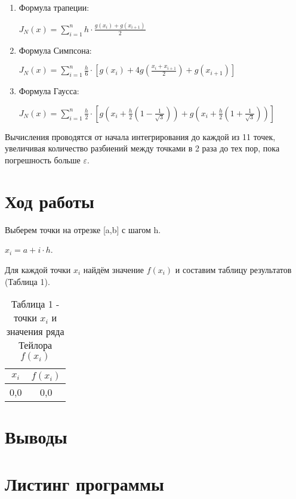 \documentclass[14pt]{article}
\begin{document}
\begin{enumerate}
{\begin{enumerate}
{                }
            \item {
                Формула трапеции:
                \begin{center}
                    $J_N(x) = \displaystyle\sum_{i=1}^{n}h \cdot \displaystyle\frac{g(x_i)+g(x_{i+1})}{2}$
                \end{center}
                }
            \item {
                Формула Симпсона:
                \begin{center}
                    $J_N(x) = \displaystyle\sum_{i=1}^{n}\displaystyle\frac{h}{6} \cdot \left[g(x_i)+4g\left(
                        \displaystyle\frac{x_i + x_{i+1}}{2}
                    \right) + g(x_{i+1}) \right]$
                \end{center}
                }
            \item {
                Формула Гаусса:
                \begin{center}
                    $J_N(x) = \displaystyle\sum_{i=1}^{n}\displaystyle\frac{h}{2} \cdot \left[g\left(
                        x_i + \displaystyle\frac{h}{2}\left(1 - \displaystyle\frac{1}{\sqrt{3}} \right)
                    \right) +
                    g\left(
                        x_i + \displaystyle\frac{h}{2}\left(1 + \displaystyle\frac{1}{\sqrt{3}} \right)
                    \right)
                    \right]$
                \end{center}
                }
        \end{enumerate}
    }
\end{enumerate}

Вычисления проводятся от начала интегрирования до каждой из 11 точек, увеличивая количество разбиений между точками в 2 раза до тех пор, пока погрешность больше $\varepsilon$.
\newpage
\section{Ход работы}
Выберем точки на отрезке [a,b] с шагом h.
\begin{center}
    $x_i = a + i \cdot h$.
\end{center}
Для каждой точки $x_i$ найдём значение $f(x_i)$ и составим таблицу результатов (Таблица 1).
\begin{table}[h]
    \centering
    \begin{tabular}{|c|c|}
        \hline
        $x_i$ & $f(x_i)$\\
        \hline
        0,0 & 0,0\\
        \hline
    \end{tabular}
    \caption*{Таблица 1 - точки $x_i$ и значения ряда Тейлора $f(x_i)$}
\end{table}
\newpage
\section{Выводы}

\newpage
\section{Листинг программы}
\end{document}

